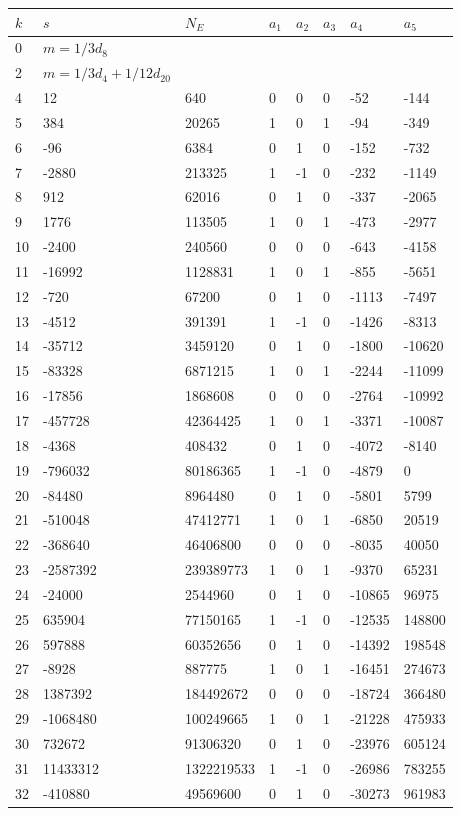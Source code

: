 \documentclass{amsart}
\begin{document}
\begin{longtable}{|l|l|l|lllll|}
\hline
$k$ & $s$ & $N_E$ & $a_1$ & $a_2$ & $a_3$ & $a_4$ & $a_5$\\
\hline
0&$m=1/3d_{8}$&&\multicolumn{5}{c|}{}\\
2&$m=1/3d_{4}+1/12d_{20}$&&\multicolumn{5}{c|}{}\\
4&12&640&0&0&0&-52&-144\\
5&384&20265&1&0&1&-94&-349\\
6&-96&6384&0&1&0&-152&-732\\
7&-2880&213325&1&-1&0&-232&-1149\\
8&912&62016&0&1&0&-337&-2065\\
9&1776&113505&1&0&1&-473&-2977\\
10&-2400&240560&0&0&0&-643&-4158\\
11&-16992&1128831&1&0&1&-855&-5651\\
12&-720&67200&0&1&0&-1113&-7497\\
13&-4512&391391&1&-1&0&-1426&-8313\\
14&-35712&3459120&0&1&0&-1800&-10620\\
15&-83328&6871215&1&0&1&-2244&-11099\\
16&-17856&1868608&0&0&0&-2764&-10992\\
17&-457728&42364425&1&0&1&-3371&-10087\\
18&-4368&408432&0&1&0&-4072&-8140\\
19&-796032&80186365&1&-1&0&-4879&0\\
20&-84480&8964480&0&1&0&-5801&5799\\
21&-510048&47412771&1&0&1&-6850&20519\\
22&-368640&46406800&0&0&0&-8035&40050\\
23&-2587392&239389773&1&0&1&-9370&65231\\
24&-24000&2544960&0&1&0&-10865&96975\\
25&635904&77150165&1&-1&0&-12535&148800\\
26&597888&60352656&0&1&0&-14392&198548\\
27&-8928&887775&1&0&1&-16451&274673\\
28&1387392&184492672&0&0&0&-18724&366480\\
29&-1068480&100249665&1&0&1&-21228&475933\\
30&732672&91306320&0&1&0&-23976&605124\\
31&11433312&1322219533&1&-1&0&-26986&783255\\
32&-410880&49569600&0&1&0&-30273&961983\\

\end{longtable}
\end{document}
